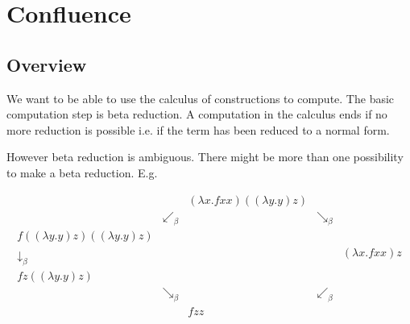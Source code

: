 \section{Confluence}

\begin{comment}

    Why: Make lambda calculus really a model of computation. Result (i.e. a
    term in normal form) is independent of the reduction sequence.

    Goal: Uniqueness of normal forms and beta equivalent terms have a common
    reduct. Corollaries: Equivalent binders have equivalent subterms and binders
    cannot reduce to be beta equivalent with sorts or variables.

    Basic Property: Beta reduction is confluent.


    Prove of confluence:

    - Definition via diamonds

    - Diamond between a relation and its reflexive transitive closure proves the
    confluence of the relation.

    - Parallel beta reduction is a diamond between beta reduction and its
    reflexive transitive closure.


\end{comment}




\subsection{Overview}

We want to be able to use the calculus of constructions to compute.
The basic computation step is beta reduction. A computation in the calculus ends
if no more reduction is possible i.e. if the term has been reduced to a normal
form.

However beta reduction is ambiguous. There might be more than one possibility to
make a beta reduction. E.g.

$$
\begin{array}{cccccc}
    & & (\lambda x. f x x) ((\lambda y.y) z)
    \\
    & \swarrow_{\beta}
    & & \searrow_\beta
    \\
    f ((\lambda y.y) z) ((\lambda y.y) z)
    \\
    \downarrow_\beta
    & & & & (\lambda x . f x x) z
    \\
    f z ((\lambda y.y) z)
    \\
    & \searrow_\beta
    & &  \swarrow_\beta
    \\
    & & f z z
\end{array}
$$

